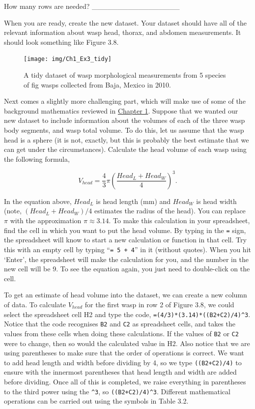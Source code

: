 \documentclass[
]{scrbook}
\begin{document}
How many rows are needed? \_\_\_\_\_\_\_\_\_\_\_\_\_\_\_\_\_

When you are ready, create the new dataset.
Your dataset should have all of the relevant information about wasp head, thorax, and abdomen measurements.
It should look something like Figure 3.8.

\begin{figure}
\texttt{[image: img/Ch1\_Ex3\_tidy]} \caption{A tidy dataset of wasp morphological measurements from 5 species of fig wasps collected from Baja, Mexico in 2010.}\label{fig:unnamed-chunk-19}
\end{figure}

Next comes a slightly more challenging part, which will make use of some of the background mathematics reviewed in \protect\hyperlink{Chapter_1}{Chapter 1}.
Suppose that we wanted our new dataset to include information about the volumes of each of the three wasp body segments, and wasp total volume.
To do this, let us assume that the wasp head is a sphere (it is not, exactly, but this is probably the best estimate that we can get under the circumstances).
Calculate the head volume of each wasp using the following formula,

\[V_{head} = \frac{4}{3}\pi \left(\frac{Head_L + Head_W}{4}\right)^{3}.\]

In the equation above, \(Head_{L}\) is head length (mm) and \(Head_{W}\) is head width (note, \((Head_L + Head_W)/4\) estimates the radius of the head).
You can replace \(\pi\) with the approximation \(\pi \approx 3.14\).
To make this calculation in your spreadsheet, find the cell in which you want to put the head volume.
By typing in the \texttt{=} sign, the spreadsheet will know to start a new calculation or function in that cell.
Try this with an empty cell by typing ``\texttt{=\ 5\ +\ 4}'' in it (without quotes).
When you hit `Enter', the spreadsheet will make the calculation for you, and the number in the new cell will be 9.
To see the equation again, you just need to double-click on the cell.

To get an estimate of head volume into the dataset, we can create a new column of data.
To calculate \(V_{head}\) for the first wasp in row 2 of Figure 3.8, we could select the spreadsheet cell H2 and type the code, \texttt{=(4/3)*(3.14)*((B2+C2)/4)\^{}3}.
Notice that the code recognises \texttt{B2} and \texttt{C2} as spreadsheet cells, and takes the values from these cells when doing these calculations.
If the values of \texttt{B2} or \texttt{C2} were to change, then so would the calculated value in H2.
Also notice that we are using parentheses to make sure that the order of operations is correct.
We want to add head length and width before dividing by 4, so we type \texttt{((B2+C2)/4)} to ensure with the innermost parentheses that head length and width are added before dividing.
Once all of this is completed, we raise everything in parentheses to the third power using the \texttt{\^{}3}, so \texttt{((B2+C2)/4)\^{}3}.
Different mathematical operations can be carried out using the symbols in Table 3.2.
\end{document}
